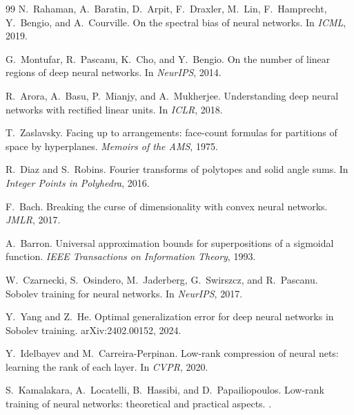 \documentclass[10pt,twocolumn]{article}
\newcommand{\1}{\mathbf{1}}
\begin{document}
\begin{thebibliography}{99}
N.~Rahaman, A.~Baratin, D.~Arpit, F.~Draxler, M.~Lin, F.~Hamprecht, Y.~Bengio, and A.~Courville.
\newblock On the spectral bias of neural networks.
\newblock In \emph{ICML}, 2019.

G.~Montufar, R.~Pascanu, K.~Cho, and Y.~Bengio.
\newblock On the number of linear regions of deep neural networks.
\newblock In \emph{NeurIPS}, 2014.

R.~Arora, A.~Basu, P.~Mianjy, and A.~Mukherjee.
\newblock Understanding deep neural networks with rectified linear units.
\newblock In \emph{ICLR}, 2018.

T.~Zaslavsky.
\newblock Facing up to arrangements: face-count formulas for partitions of space by hyperplanes.
\newblock \emph{Memoirs of the AMS}, 1975.

R.~Diaz and S.~Robins.
\newblock Fourier transforms of polytopes and solid angle sums.
\newblock In \emph{Integer Points in Polyhedra}, 2016.

F.~Bach.
\newblock Breaking the curse of dimensionality with convex neural networks.
\newblock \emph{JMLR}, 2017.

A.~Barron.
\newblock Universal approximation bounds for superpositions of a sigmoidal function.
\newblock \emph{IEEE Transactions on Information Theory}, 1993.

W.~Czarnecki, S.~Osindero, M.~Jaderberg, G.~Swirszcz, and R.~Pascanu.
\newblock Sobolev training for neural networks.
\newblock In \emph{NeurIPS}, 2017.

Y.~Yang and Z.~He.
\newblock Optimal generalization error for deep neural networks in Sobolev training.
\newblock arXiv:2402.00152, 2024.

Y.~Idelbayev and M.~Carreira-Perpinan.
\newblock Low-rank compression of neural nets: learning the rank of each layer.
\newblock In \emph{CVPR}, 2020.

S.~Kamalakara, A.~Locatelli, B.~Hassibi, and D.~Papailiopoulos.
\newblock Low-rank training of neural networks: theoretical and practical aspects.
.
\end{thebibliography}
\end{document}
